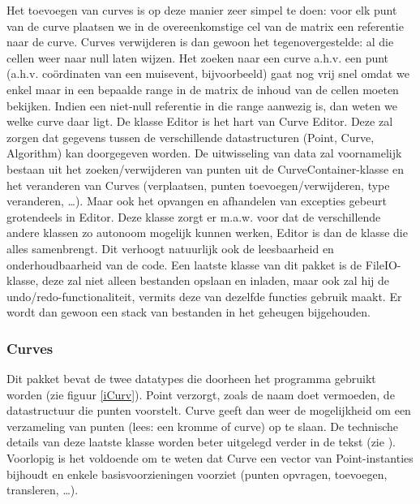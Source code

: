\documentclass[a4paper,11pt,oneside, titlepage]{article}
\begin{document}
Het toevoegen van curves is op deze manier zeer simpel te doen: voor elk punt van de curve plaatsen we in de overeenkomstige cel van de matrix een referentie naar de curve.
Curves verwijderen is dan gewoon het tegenovergestelde: al die cellen weer naar null laten wijzen. Het zoeken naar een curve a.h.v. een punt (a.h.v. co\"ordinaten van een muisevent, bijvoorbeeld) 
gaat nog vrij snel omdat we enkel maar in een bepaalde range in de matrix de inhoud van de cellen moeten bekijken. Indien een niet-null referentie in die range aanwezig is, dan weten we welke curve
daar ligt.\newline \newline
De klasse Editor is het hart van Curve Editor. Deze zal zorgen dat gegevens tussen de verschillende datastructuren (Point, Curve, Algorithm) kan doorgegeven worden.
De uitwisseling van data zal voornamelijk bestaan uit het zoeken/verwijderen van punten uit de CurveContainer-klasse en het veranderen van Curves (verplaatsen, punten toevoegen/verwijderen, type veranderen, \ldots).
Maar ook het opvangen en afhandelen van excepties gebeurt grotendeels in Editor. Deze klasse zorgt er m.a.w. voor dat de 
verschillende andere klassen zo autonoom mogelijk kunnen werken, Editor is dan de klasse die alles samenbrengt. Dit verhoogt natuurlijk ook de leesbaarheid en onderhoudbaarheid van de code.\newline \newline
Een laatste klasse van dit pakket is de FileIO-klasse, deze zal niet alleen bestanden opslaan en
inladen, maar ook zal hij de undo/redo-functionaliteit, vermits deze van
dezelfde functies gebruik maakt. Er wordt dan gewoon een stack van bestanden in het geheugen bijgehouden.
\subsubsection{Curves}
Dit pakket bevat de twee datatypes die doorheen het programma gebruikt worden (zie figuur \ref{iCurv}). Point verzorgt, zoals
de naam doet vermoeden, de datastructuur die punten voorstelt. Curve geeft dan weer de
mogelijkheid om een verzameling van punten (lees: een kromme of curve) op te slaan. De
technische details van deze laatste klasse worden beter uitgelegd verder in de tekst (zie ). 
Voorlopig is het voldoende om te weten dat Curve een vector van Point-instanties bijhoudt en enkele
basisvoorzieningen voorziet (punten opvragen, toevoegen, transleren, \ldots).
\end{document}
